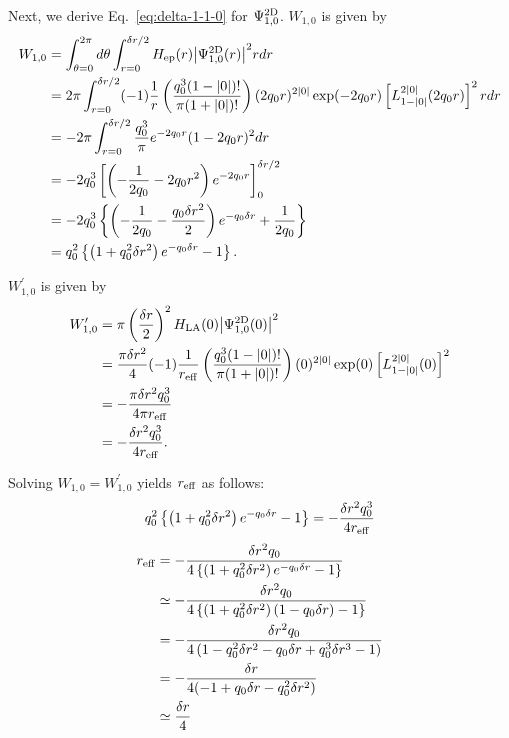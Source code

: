 \documentclass[jctc-draft.tex]{subfiles}
\begin{document}
Next, we derive Eq.~\eqref{eq:delta-1-1-0} for $\Psi^{\mathrm{2D}}_{1,0}$.
$W_{1,0}$ is given by
\begin{align}
  W_{1,0}
   &= \int_{\theta=0}^{2\pi}d\theta
      \int_{r=0}^{\delta r/2}H_{\mathrm{ep}}(r){\left| \Psi^{\mathrm{2D}}_{1,0}(r) \right|}^2r dr\notag\\
   &= 2\pi\int_{r=0}^{\delta r/2}
      (-1)\frac{1}{r}\left(\frac{q_0^3(1-{\left| 0 \right|})!}{\pi(1+{\left| 0 \right|})!}\right)
      (2q_0r)^{2{\left| 0 \right|}}\exp(-2q_0r)
      \left[L_{1-{\left| 0 \right|}}^{2{\left| 0 \right|}}(2q_0r)\right]^2 r dr\notag\\
   &= -2\pi\int_{r=0}^{\delta r/2}\frac{q_0^3}{\pi}e^{-2q_0r}(1-2q_0r)^2dr\notag\\
   &= -2q_0^3\left[\left(-\frac{1}{2q_0}-2q_0r^2\right)e^{-2q_0r}\right]_{0}^{\delta r/2} \notag\\
   &= -2q_0^3\left\{\left(-\frac{1}{2q_0}-\frac{q_0\delta r^2}{2}\right)e^{-q_0\delta r}+\frac{1}{2q_0}\right\}\notag\\
   &= q_0^2\left\{\left(1+q_0^2\delta r^2\right)e^{-q_0\delta r}-1\right\} .
\end{align}

$W_{1,0}^\prime$ is given by
\begin{align}
    W_{1,0}^\prime
    &=\pi\left(\frac{\delta r}{2}\right)^2
         H_{\mathrm{LA}}(0){\left| \Psi^{\mathrm{2D}}_{1,0}(0) \right|}^2\notag\\
    &=\frac{\pi\delta r^2}{4}(-1)\frac{1}{r_{\mathrm{eff}}}
    \left(\frac{q_0^3(1-{\left| 0 \right|})!}{\pi(1+{\left| 0 \right|})!}\right)
    (0)^{2{\left| 0 \right|}}\exp(0)\left[L_{1-{\left| 0 \right|}}^{2{\left| 0 \right|}}(0)\right]^2\notag\\
    &= -\frac{\pi\delta r^2q_0^3}{4\pi r_{\mathrm{eff}}}\notag\\
    &= -\frac{\delta r^2q_0^3}{4r_{\mathrm{eff}}} .
\end{align}

Solving $W_{1,0}=W_{1,0}^\prime$ yields $r_{\mathrm{eff}}$ as follows:
\begin{equation}
q_0^2\left\{\left(1+q_0^2\delta r^2\right)e^{-q_0\delta r}-1\right\}
=-\frac{\delta r^2q_0^3}{4r_{\mathrm{eff}}}
\end{equation}
\begin{align}
r_{\mathrm{eff}}&=-\frac{\delta r^2q_0}{4\left\{\left(1+q_0^2\delta r^2\right)e^{-q_0\delta r}-1\right\}}\notag\\
&\simeq-\frac{\delta r^2q_0}{4\left\{\left(1+q_0^2\delta r^2\right)(1-q_0\delta r)-1\right\}}\notag\\
&=-\frac{\delta r^2q_0}{4\left(1-q_0^2\delta r^2-q_0\delta r+q_0^3\delta r^3-1\right)}\notag\\
&=-\frac{\delta r}{4(-1+q_0\delta r-q_0^2\delta r^2)}\notag\\
&\simeq\frac{\delta r}{4}
\end{align}
\end{document}
